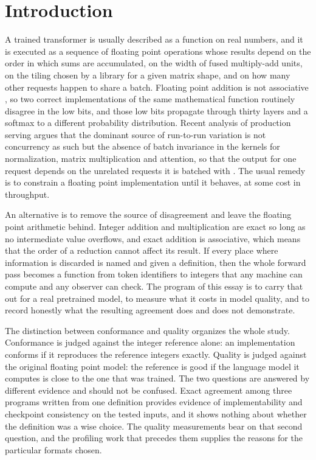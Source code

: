 \documentclass[11pt]{article}
\begin{document}
\section{Introduction}

A trained transformer is usually described as a function on real numbers, and it is executed as a sequence of floating point operations whose results depend on the order in which sums are accumulated, on the width of fused multiply-add units, on the tiling chosen by a library for a given matrix shape, and on how many other requests happen to share a batch. Floating point addition is not associative \cite{goldberg1991}, so two correct implementations of the same mathematical function routinely disagree in the low bits, and those low bits propagate through thirty layers and a softmax to a different probability distribution. Recent analysis of production serving argues that the dominant source of run-to-run variation is not concurrency as such but the absence of batch invariance in the kernels for normalization, matrix multiplication and attention, so that the output for one request depends on the unrelated requests it is batched with \cite{he2025}. The usual remedy is to constrain a floating point implementation until it behaves, at some cost in throughput.

An alternative is to remove the source of disagreement and leave the floating point arithmetic behind. Integer addition and multiplication are exact so long as no intermediate value overflows, and exact addition is associative, which means that the order of a reduction cannot affect its result. If every place where information is discarded is named and given a definition, then the whole forward pass becomes a function from token identifiers to integers that any machine can compute and any observer can check. The program of this essay is to carry that out for a real pretrained model, to measure what it costs in model quality, and to record honestly what the resulting agreement does and does not demonstrate.

The distinction between conformance and quality organizes the whole study. Conformance is judged against the integer reference alone: an implementation conforms if it reproduces the reference integers exactly. Quality is judged against the original floating point model: the reference is good if the language model it computes is close to the one that was trained. The two questions are answered by different evidence and should not be confused. Exact agreement among three programs written from one definition provides evidence of implementability and checkpoint consistency on the tested inputs, and it shows nothing about whether the definition was a wise choice. The quality measurements bear on that second question, and the profiling work that precedes them supplies the reasons for the particular formats chosen.
\end{document}
